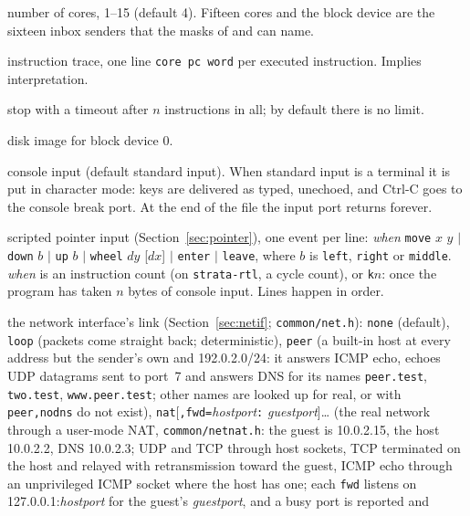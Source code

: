 \begin{description}[leftmargin=1em,style=nextline]
\item[\texttt{-c n}] number of cores, 1--15 (default 4). Fifteen cores and the block device are the
  sixteen inbox senders that the masks of  and  can name.
\item[\texttt{-t file}] instruction trace, one line \texttt{core pc word} per executed instruction.
  Implies interpretation.
\item[\texttt{-m n}] stop with a timeout after $n$ instructions in all; by default there is no limit.
\item[\texttt{-d file}] disk image for block device 0.
\item[\texttt{-i file}] console input (default standard input). When standard input is a terminal it
  is put in character mode: keys are delivered as typed, unechoed, and Ctrl-C goes to the console break
  port. At the end of the file the input port returns  forever.
\item[\texttt{-P file}] scripted pointer input (Section~\ref{sec:pointer}), one event per line:
  \textit{when} \texttt{move} $x$ $y$ $|$ \texttt{down} $b$ $|$ \texttt{up} $b$ $|$ \texttt{wheel} $dy$
  [$dx$] $|$ \texttt{enter} $|$ \texttt{leave}, where $b$ is \texttt{left}, \texttt{right} or
  \texttt{middle}. \textit{when} is an instruction count (on \texttt{strata-rtl}, a cycle count), or
  \texttt{k}$n$: once the program has taken $n$ bytes of console input. Lines happen in order.
\item[\texttt{-N mode}] the network interface's link (Section~\ref{sec:netif}; \texttt{common/net.h}):
  \texttt{none} (default), \texttt{loop} (packets come straight back; deterministic),
  \texttt{peer} (a built-in host at every address but the sender's own and 192.0.2.0/24: it
  answers ICMP echo, echoes UDP datagrams sent to port~7 and answers DNS for its names
  \texttt{peer.test}, \texttt{two.test}, \texttt{www.peer.test}; other names are looked up for real,
  or with \texttt{peer,nodns} do not exist), \texttt{nat}[\texttt{,fwd=}\textit{hostport}\texttt{:}%
  \textit{guestport}]\ldots{} (the real network through a user-mode NAT, \texttt{common/netnat.h}:
  the guest is 10.0.2.15, the host 10.0.2.2, DNS 10.0.2.3; UDP and TCP through host sockets, TCP
  terminated on the host and relayed with retransmission toward the guest, ICMP echo through an
  unprivileged ICMP socket where the host has one; each \texttt{fwd} listens on
  127.0.0.1:\textit{hostport} for the guest's \textit{guestport}, and a busy port is reported and

\end{description}
